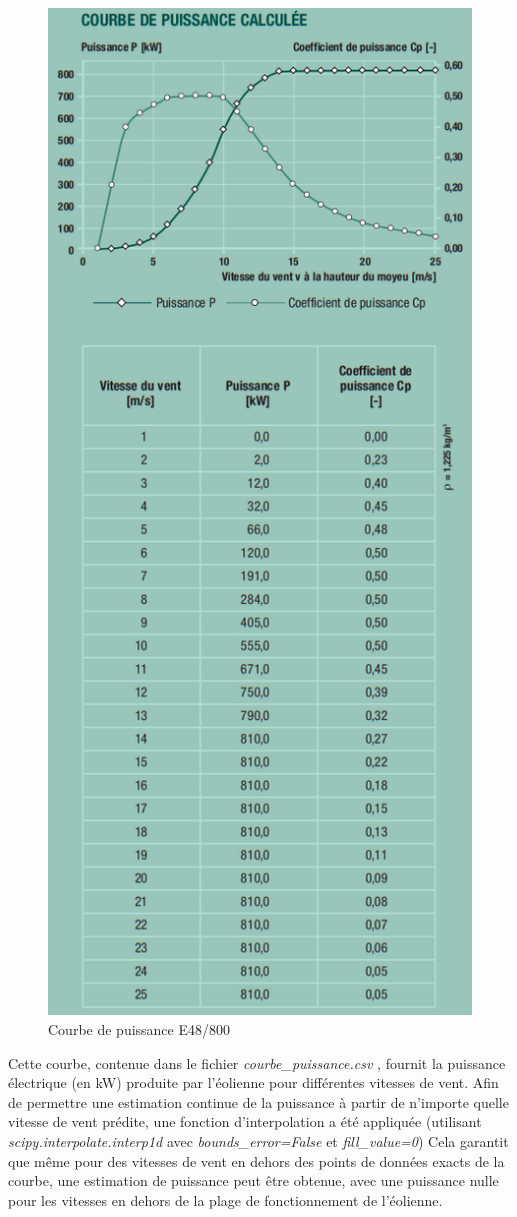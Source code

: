 \documentclass[12pt]{article}
\begin{document}
\begin{itemize}[label=$\color{blue}\clubsuit$]
\begin{figure}[H]
		\includegraphics[width=0.6\linewidth]{../graphique/courbe_puissance_e80}
		\caption{Courbe de puissance E48/800}
		\label{fig:courbe_puissance_e80}
	\end{figure}
	 Cette courbe, contenue dans le fichier \textit{courbe\_puissance.csv} , fournit la puissance électrique (en kW) produite par l'éolienne pour différentes vitesses de vent. Afin de permettre une estimation continue de la puissance à partir de n'importe quelle vitesse de vent prédite, une fonction d'interpolation a été appliquée (utilisant \textit{scipy.interpolate.interp1d} avec \textit{bounds\_error=False} et \textit{fill\_value=0}) Cela garantit que même pour des vitesses de vent en dehors des points de données exacts de la courbe, une estimation de puissance peut être obtenue, avec une puissance nulle pour les vitesses en dehors de la plage de fonctionnement de l'éolienne.
\end{itemize}
\end{document}
